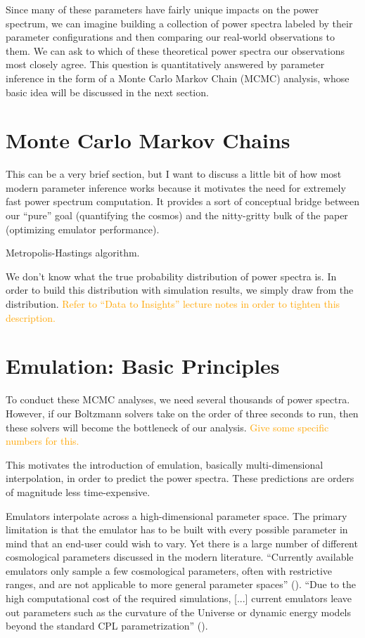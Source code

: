 Since many of these parameters have fairly unique impacts on the power 
spectrum, we can imagine building a collection of power spectra labeled by
their parameter configurations and then comparing our real-world observations 
to them. We can ask to which of these theoretical power spectra our 
observations most closely agree. This question is quantitatively answered by 
parameter inference in the form of a Monte Carlo Markov Chain (MCMC) analysis, whose basic idea will be discussed in the next section.


\section{Monte Carlo Markov Chains}

This can be a very brief section, but I want to discuss a little bit of how most modern parameter inference works because it motivates the need for extremely fast power spectrum computation. It provides a sort of conceptual bridge between our ``pure'' goal (quantifying the cosmos) and the nitty-gritty bulk of the paper (optimizing emulator performance).

Metropolis-Hastings algorithm.

We don't know what the true probability distribution of power spectra is. In order to build this distribution with simulation results, we simply draw from the distribution. \textcolor{orange}{Refer to ``Data to Insights'' lecture notes in order to tighten this description.}

\section{Emulation: Basic Principles}
\label{sec: emulation_intro}

To conduct these MCMC analyses, we need several thousands of power spectra. However, if our Boltzmann solvers take on the order of three seconds to run, then these solvers will become the bottleneck of our analysis. \textcolor{orange}{Give some specific numbers for this.}

This motivates the introduction of emulation, basically multi-dimensional interpolation, in order to predict the power spectra. These predictions are orders of magnitude less time-expensive. 

Emulators interpolate across a high-dimensional parameter space. The primary
limitation is that the emulator has to be built with every possible parameter
in mind that an end-user could wish to vary. Yet there is a large number of
different cosmological parameters discussed in the modern literature.
``Currently available emulators only sample a few cosmological parameters,
often with restrictive ranges, and are not applicable to more general
parameter
spaces'' (). ``Due to the high computational cost of the required
simulations, [...] current emulators leave out parameters such as the
curvature
of the Universe or dynamic energy models beyond the standard CPL
parametrization'' ().

